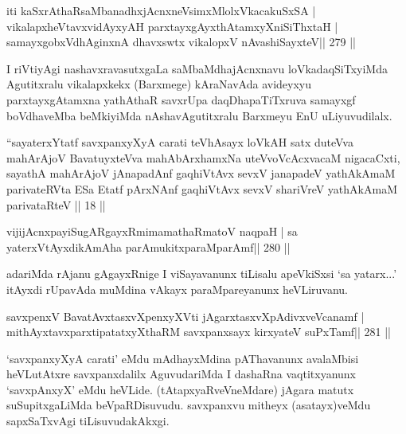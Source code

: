 \begin{shl}
iti kaSxrAthaRsaMbanadhxjAcnxneV\s simxMlolxVkacakuSxSA |
vikalapxheVtavxvidAyxyAH parxtayxgAyxthAtamxyXniSiThxtaH |
samayxgobxVdhAginxnA dhavxswtx vikalopxV nAvashiSayxteV\hfill || 279 ||
\end{shl}

\begin{artha}
I riVtiyAgi nashavxravasutxgaLa saMbaMdhajAcnxnavu loVkadaqSiTxyiMda Agutitxralu vikalapxkekx (Barxmege) kAraNavAda avideyxyu parxtayxgAtamxna yathAthaR savxrUpa daqDhapaTiTxruva samayxgf boVdhaveMba beMkiyiMda nAshavAgutitxralu Barxmeyu EnU uLiyuvudilalx.
\end{artha}




\begin{kandikeshl}
``sayaterxYtatf savxpanxyXyA carati teVhAsayx loVkAH
satx duteVva mahArAjoV BavatuyxteVva mahAbArxhamxNa
uteVvoVcAcxvacaM nigacaCxti, sayathA mahArAjoV
jAnapadAnf gaqhiVtAvx sevxV janapadeV yathAkAmaM
parivateRVta ESa Etatf pArxNAnf gaqhiVtAvx sevxV
shariVreV yathAkAmaM parivataRteV || 18 ||
\end{kandikeshl}

\begin{shl}
vijijAcnxpayiSugARgayxRmimamathaRmatoV naqpaH |
sa yaterxVtAyxdikAmAha parAmukitxparaMparAmf\hfill || 280 ||
\end{shl}

\begin{artha}
adariMda rAjanu gAgayxRnige I viSayavanunx tiLisalu apeVkiSxsi `sa  yatarx...' itAyxdi rUpavAda muMdina vAkayx paraMpareyanunx heVLiruvanu.
\end{artha}

\begin{shl}
savxpenxV BavatAvxtasxvXpenxyXVti jAgarxtasxvXpAdivxveVcanamf |
mithAyxtavxparxtipatatxyXthaRM savxpanxsayx kirxyateV suPxTamf\hfill || 281 ||
\end{shl}

\begin{artha}
`savxpanxyXyA carati' eMdu mAdhayxMdina pAThavanunx avalaMbisi  heVLutAtxre  \mdash  savxpanxdalilx AguvudariMda I dashaRna vaqtitxyanunx  `savxpAnxyX' eMdu heVLide. (tAtapxyaRveVneMdare) jAgara matutx suSupitxgaLiMda beVpaRDisuvudu. savxpanxvu mitheyx (asatayx)veMdu sapxSaTxvAgi tiLisuvudakAkxgi.
\end{artha}

